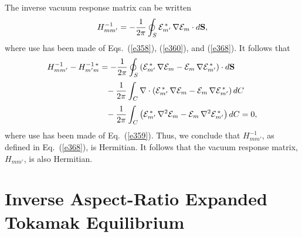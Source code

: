 \documentclass[12pt,prb,aps]{revtex4-1}
\begin{document}
The inverse vacuum response matrix can be written
\begin{equation}\label{e369}
H_{mm'}^{-1} =-\frac{1}{2\pi}\oint_S {\cal E}_{m'}^{\,\ast}\,\nabla{\cal E}_m\cdot d{\bf S},
\end{equation}
where use has been made of Eqs.~(\ref{e358}), (\ref{e360}), and (\ref{e368}). It follows that
\begin{align}\label{e370}
H_{mm'}^{-1}-H_{m'm}^{-1\,\ast} &= -\frac{1}{2\pi}\oint_S\left({\cal E}_{m'}^{\,\ast}\,\nabla{\cal E}_m-{\cal E}_m\,\nabla{\cal E}_{m'}^{\,\ast}\right)\cdot
d{\bf S}\nonumber\\[0.5ex]
&\phantom{=}-\frac{1}{2\pi}\int_C\nabla\cdot\left({\cal E}_{m'}^{\,\ast}\,\nabla{\cal E}_m-{\cal E}_m\,\nabla{\cal E}_{m'}^{\,\ast}\right)dC\nonumber\\[0.5ex]
&\phantom{=}-\frac{1}{2\pi}\int_C\left({\cal E}_{m'}^{\,\ast}\,\nabla^2{\cal E}_m-{\cal E}_m\,\nabla^2{\cal E}_{m'}^{\,\ast}\right)dC=0,
\end{align}
where use has been made of Eq.~(\ref{e359}). Thus, we conclude that $H_{mm'}^{-1}$, as defined in Eq.~(\ref{e368}), is   Hermitian. It follows that the vacuum response matrix, $H_{mm'}$, is also Hermitian. 

\section{Inverse Aspect-Ratio Expanded Tokamak Equilibrium}\label{large}
\end{document}
